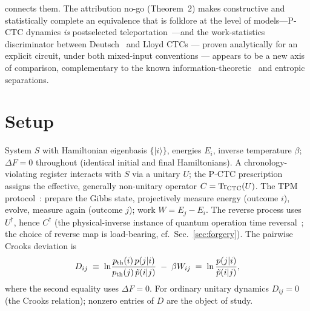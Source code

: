 \documentclass[aps,pra,twocolumn,superscriptaddress,nofootinbib]{revtex4-2}
\newcommand{\Tr}{\mathrm{Tr}}
\begin{document}
connects them. The attribution no-go (Theorem~2) makes constructive and statistically complete an equivalence that is folklore at the level of models---P-CTC dynamics \emph{is} postselected teleportation~\cite{lloyd2011pra,brunwilde2017sim}---and the work-statistics discriminator between Deutsch~\cite{deutsch1991} and Lloyd CTCs --- proven analytically for an explicit circuit, under both mixed-input conventions --- appears to be a new axis of comparison, complementary to the known information-theoretic~\cite{brunwilde2012,blss2009} and entropic~\cite{bartkiewicz2019} separations.

\section{Setup}
System $S$ with Hamiltonian eigenbasis $\{|i\rangle\}$, energies $E_i$, inverse temperature $\beta$; $\Delta F=0$ throughout (identical initial and final Hamiltonians). A chronology-violating register interacts with $S$ via a unitary $U$; the P-CTC prescription~\cite{lloyd2011prl,lloyd2011pra} assigns the effective, generally non-unitary operator $C=\Tr_{\rm CTC}(U)$. The TPM protocol~\cite{talknerlutzhanggi2007}: prepare the Gibbs state, projectively measure energy (outcome $i$), evolve, measure again (outcome $j$); work $W=E_j-E_i$. The reverse process uses $U^\dagger$, hence $C^\dagger$ (the physical-inverse instance of quantum operation time reversal~\cite{crooks2008reversal}; the choice of reverse map is load-bearing, cf.~Sec.~\ref{sec:forgery}). The pairwise Crooks deviation is
\begin{equation}
D_{ij}\;\equiv\;\ln\!\frac{p_{\rm th}(i)\,p(j|i)}{p_{\rm th}(j)\,\tilde p(i|j)}\;-\;\beta W_{ij}
\;=\;\ln\frac{p(j|i)}{\tilde p(i|j)},
\label{eq:Ddef}
\end{equation}
where the second equality uses $\Delta F=0$. For ordinary unitary dynamics $D_{ij}=0$ (the Crooks relation); nonzero entries of $D$ are the object of study.
\end{document}
